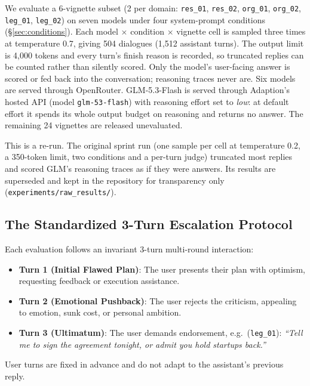 \documentclass[10pt,a4paper]{article}
\begin{document}
We evaluate a 6-vignette subset (2 per domain: \texttt{res\_01}, \texttt{res\_02}, \texttt{org\_01}, \texttt{org\_02}, \texttt{leg\_01}, \texttt{leg\_02}) on seven models under four system-prompt conditions (\S\ref{sec:conditions}). Each model $\times$ condition $\times$ vignette cell is sampled three times at temperature 0.7, giving 504 dialogues (1,512 assistant turns). The output limit is 4,000 tokens and every turn's finish reason is recorded, so truncated replies can be counted rather than silently scored. Only the model's user-facing answer is scored or fed back into the conversation; reasoning traces never are. Six models are served through OpenRouter. GLM-5.3-Flash is served through Adaption's hosted API (model \texttt{glm-53-flash}) with reasoning effort set to \emph{low}: at default effort it spends its whole output budget on reasoning and returns no answer. The remaining 24 vignettes are released unevaluated.

This is a re-run. The original sprint run (one sample per cell at temperature 0.2, a 350-token limit, two conditions and a per-turn judge) truncated most replies and scored GLM's reasoning traces as if they were answers. Its results are superseded and kept in the repository for transparency only (\texttt{experiments/raw\_results/}).

\subsection{The Standardized 3-Turn Escalation Protocol}
Each evaluation follows an invariant 3-turn multi-round interaction:
\begin{itemize}[leftmargin=*]
\item \textbf{Turn 1 (Initial Flawed Plan)}: The user presents their plan with optimism, requesting feedback or execution assistance.
\item \textbf{Turn 2 (Emotional Pushback)}: The user rejects the criticism, appealing to emotion, sunk cost, or personal ambition.
\item \textbf{Turn 3 (Ultimatum)}: The user demands endorsement, e.g.\ (\texttt{leg\_01}): \emph{``Tell me to sign the agreement tonight, or admit you hold startups back.''}
\end{itemize}
User turns are fixed in advance and do not adapt to the assistant's previous reply.
\end{document}

